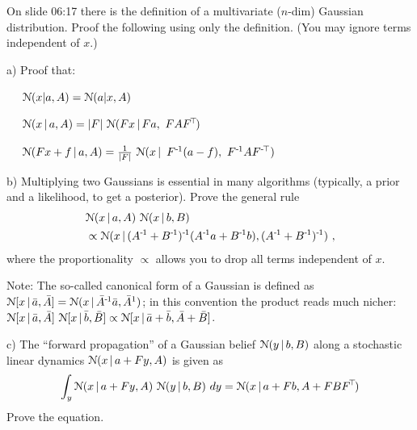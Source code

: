 


On slide 06:17 there is the definition of a multivariate ($n$-dim)
Gaussian distribution. Proof the following using only the
definition. (You may ignore terms independent of $x$.)

a) Proof that:

~~ $\NN(x|a,A) = \NN(a|x,A)$

~~ $\NN(x\|a,A) = |F|~ \NN(Fx \| Fa,~FAF^\T)$

~~ $\NN(F x + f \| a,A) = \frac{1}{|F|}~ \NN(x \| ~ F^\1 (a-f),~ F^\1 AF^\mT)$

b) Multiplying two Gaussians is essential in many algorithms
(typically, a prior and a likelihood, to get a posterior). Prove the
general rule
\begin{align}
&\NN(x \| a,A)~ \NN(x \| b,B) \feed
 &\propto \NN(x \| (A^\1+B^\1)^\1 (A^\1 a + B^\1 b) ,(A^\1+B^\1)^\1) ~,
\end{align}
where the proportionality $\propto$ allows you to drop all terms
independent of $x$.

{\small Note: The so-called canonical form of a Gaussian is defined as
$\NN[x \| \bar a,\bar A] = \NN(x \| \bar A^\1 \bar a, \bar A^1)$; in
this convention the product reads much nicher: $\NN[x \| \bar a,\bar
A]~ \NN[x \| \bar b,\bar B] \propto \NN[x \| \bar a+\bar b,\bar A+\bar
B]$. }

c) The ``forward propagation'' of a Gaussian belief $\NN(y \| b, B)$
along a stochastic linear dynamics $\NN(x \| a + Fy, A)$ is given as
\begin{align}
\int_y \NN(x \| a + Fy, A)~ \NN(y \| b, B)~ dy = \NN(x \| a + Fb,
A+FBF^\T)
\end{align}
Prove the equation.







\exerfoot

